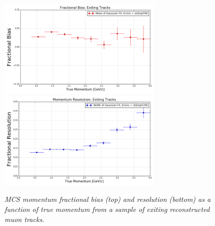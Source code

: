 \documentclass[a4paper,11pt]{article}
\begin{document}
\begin{figure}
\centering
\includegraphics[width=0.7\textwidth]
	{Figures/MCS_true_exiting_bias_MCBNBRecoTrackExiting.png}
\includegraphics[width=0.7\textwidth]
	{Figures/MCS_true_exiting_resolution_MCBNBRecoTrackExiting.png}
\caption{\textit{MCS momentum fractional bias (top) and resolution (bottom) as a function of true momentum from a sample of exiting reconstructed muon tracks.}}
\label{exitingRecoTrack_bias_resolution_fig_alllengths}
\end{figure}


\end{document}
